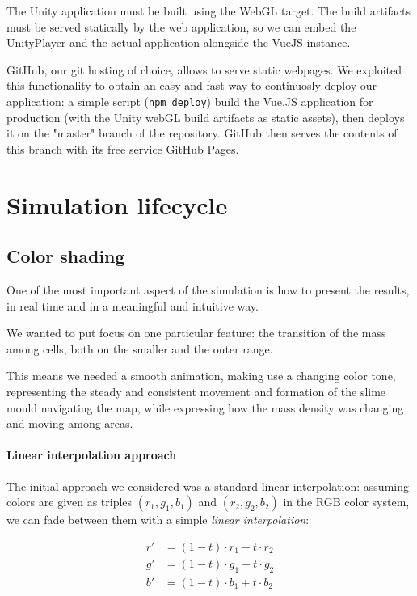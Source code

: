 The Unity application must be built using the WebGL target. The build artifacts must be served statically by the web application, so we can embed the UnityPlayer and the actual application alongside the VueJS instance.

GitHub, our git hosting of choice, allows to serve static webpages. We exploited this functionality to obtain an easy and fast way to continuosly deploy our application: a simple script (\texttt{npm deploy}) build the Vue.JS application for production (with the Unity webGL build artifacts as static assets), then deploys it on the "master" branch of the repository. GitHub then serves the contents of this branch with its free service GitHub Pages.

\section{Simulation lifecycle}


\paragraph{}

\subsection{Color shading}

One of the most important aspect of the simulation is how to present the results, in real time and in a meaningful and intuitive way. 

We wanted to put focus on one particular feature: the transition of the mass among cells, both on the smaller and the outer range.

This means we needed a smooth animation, making use a changing color tone, representing the steady and consistent movement and formation of the slime mould navigating the map, while expressing how the mass density was changing and moving among areas.

\paragraph{Linear interpolation approach}

The initial approach we considered was a standard linear interpolation: assuming colors are given as triples $(r_1,g_1,b_1)$ and $(r_2,g_2,b_2)$ in the RGB color system, we can fade between them with a simple \textit{linear interpolation}:

\begin{align}
r' &= (1-t)\cdot r_1+t\cdot r_2\\
g' &= (1-t)\cdot g_1+t\cdot g_2\\
b' &= (1-t)\cdot b_1+t\cdot b_2
\end{align}

